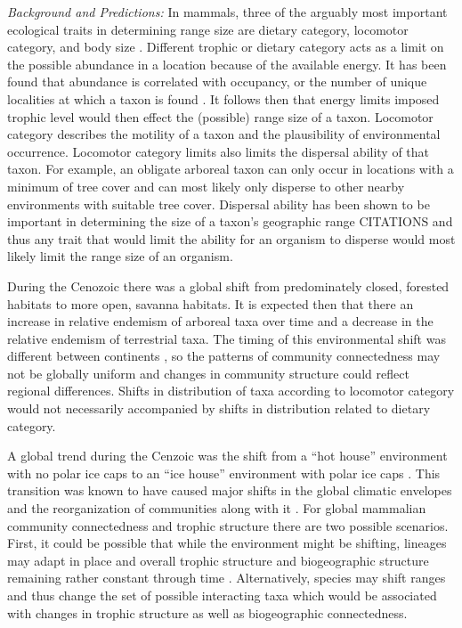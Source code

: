 \documentclass[12pt,letterpaper]{article}
\begin{document}
\textit{Background and Predictions:}
In mammals, three of the arguably most important ecological traits in determining range size are dietary category, locomotor category, and body size \citep{Jernvall2004,Smith2008b,Smith2004,Lyons2005,Lyons2010}. Different trophic or dietary category acts as a limit on the possible abundance in a location because of the available energy. It has been found that abundance is correlated with occupancy, or the number of unique localities at which a taxon is found \citep{Jernvall2002,Fortelius2002}. It follows then that energy limits imposed trophic level would then effect the (possible) range size of a taxon. Locomotor category describes the motility of a taxon and the plausibility of environmental occurrence. Locomotor category limits also limits the dispersal ability of that taxon. For example, an obligate arboreal taxon can only occur in locations with a minimum of tree cover and can most likely only disperse to other nearby environments with suitable tree cover. Dispersal ability has been shown to be important in determining the size of a taxon's geographic range CITATIONS and thus any trait that would limit the ability for an organism to disperse would most likely limit the range size of an organism.

During the Cenozoic there was a global shift from predominately closed, forested habitats to more open, savanna habitats. It is expected then that there an increase in relative endemism of arboreal taxa over time and a decrease in the relative endemism of terrestrial taxa. The timing of this environmental shift was different between continents \citep{Stromberg2005,Stromberg2013}, so the patterns of community connectedness may not be globally uniform and changes in community structure could reflect regional differences. Shifts in distribution of taxa according to locomotor category would not necessarily accompanied by shifts in distribution related to dietary category.

A global trend during the Cenzoic was the shift from a ``hot house'' environment with no polar ice caps to an ``ice house'' environment with polar ice caps \citep{Zachos2008,Zachos2001}. This transition was known to have caused major shifts in the global climatic envelopes and the reorganization of communities along with it \citep{Janis1993a,Fortelius2002,Blois2009,Alroy2000g,Figueirido2012}. For global mammalian community connectedness and trophic structure there are two possible scenarios. First, it could be possible that while the environment might be shifting, lineages may adapt in place and overall trophic structure and biogeographic structure remaining rather constant through time \citep{Jernvall2004}. Alternatively, species may shift ranges and thus change the set of possible interacting taxa which would be associated with changes in trophic structure as well as biogeographic connectedness.
\end{document}

